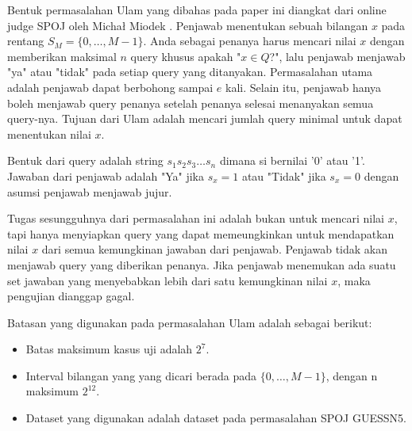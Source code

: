 \documentclass[conference,compsoc]{IEEEtran}
\begin{document}
Bentuk permasalahan Ulam yang dibahas pada paper ini diangkat dari online judge SPOJ oleh Micha\l{} Miodek \cite{guessn5}. Penjawab menentukan sebuah bilangan $x$ pada rentang $S_M=\{0,\ldots,M-1\}$. Anda sebagai penanya harus mencari nilai $x$ dengan memberikan maksimal $n$ query khusus apakah "$x \in Q$?", lalu penjawab menjawab "ya" atau "tidak" pada setiap query yang ditanyakan. Permasalahan utama adalah penjawab dapat berbohong sampai $e$ kali. Selain itu, penjawab hanya boleh menjawab query penanya setelah penanya selesai menanyakan semua query-nya. Tujuan dari Ulam adalah mencari jumlah query minimal untuk dapat menentukan nilai $x$.

Bentuk dari query adalah string $s_1s_2s_3\ldots s_n$ dimana si bernilai '0' atau '1'. Jawaban dari penjawab adalah "Ya" jika $s_x=1$ atau "Tidak" jika $s_x=0$ dengan asumsi penjawab menjawab jujur.

Tugas sesungguhnya dari permasalahan ini adalah bukan untuk mencari nilai $x$, tapi hanya menyiapkan query yang dapat memeungkinkan untuk mendapatkan nilai $x$ dari semua kemungkinan jawaban dari penjawab. Penjawab tidak akan menjawab query yang diberikan penanya. Jika penjawab menemukan ada suatu set jawaban yang menyebabkan lebih dari satu kemungkinan nilai $x$, maka pengujian dianggap gagal.

Batasan yang digunakan pada permasalahan Ulam adalah sebagai berikut:
\begin{itemize}
  \item Batas maksimum kasus uji adalah $2^7$.
  \item Interval bilangan yang yang dicari berada pada $\{0,\ldots,M-1\}$, dengan n maksimum $2^12$.
  \item Dataset yang digunakan adalah dataset pada permasalahan SPOJ GUESSN5.
\end{itemize}
\end{document}
